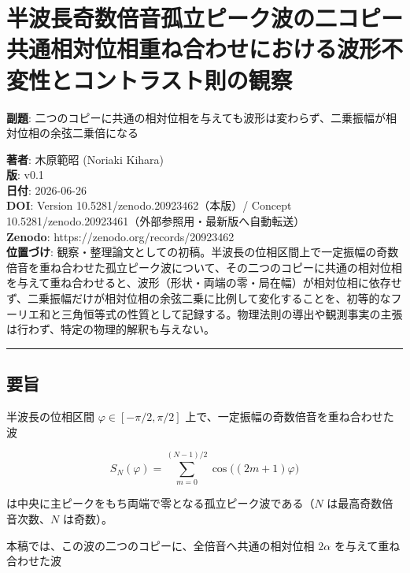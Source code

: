 \documentclass[
]{ltjsarticle}
\author{}
\date{}
\begin{document}
\section{半波長奇数倍音孤立ピーク波の二コピー共通相対位相重ね合わせにおける波形不変性とコントラスト則の観察}\label{ux534aux6ce2ux9577ux5947ux6570ux500dux97f3ux5b64ux7acbux30d4ux30fcux30afux6ce2ux306eux4e8cux30b3ux30d4ux30fcux5171ux901aux76f8ux5bfeux4f4dux76f8ux91cdux306dux5408ux308fux305bux306bux304aux3051ux308bux6ce2ux5f62ux4e0dux5909ux6027ux3068ux30b3ux30f3ux30c8ux30e9ux30b9ux30c8ux5247ux306eux89b3ux5bdf}

\textbf{副題}:
二つのコピーに共通の相対位相を与えても波形は変わらず、二乗振幅が相対位相の余弦二乗倍になる

\textbf{著者}: 木原範昭 (Noriaki Kihara)\\
\textbf{版}: v0.1\\
\textbf{日付}: 2026-06-26\\
\textbf{DOI}: Version 10.5281/zenodo.20923462（本版）/ Concept
10.5281/zenodo.20923461（外部参照用・最新版へ自動転送）\\
\textbf{Zenodo}: https://zenodo.org/records/20923462\\
\textbf{位置づけ}:
観察・整理論文としての初稿。半波長の位相区間上で一定振幅の奇数倍音を重ね合わせた孤立ピーク波について、その二つのコピーに共通の相対位相を与えて重ね合わせると、波形（形状・両端の零・局在幅）が相対位相に依存せず、二乗振幅だけが相対位相の余弦二乗に比例して変化することを、初等的なフーリエ和と三角恒等式の性質として記録する。物理法則の導出や観測事実の主張は行わず、特定の物理的解釈も与えない。

\begin{center}\rule{0.5\linewidth}{0.5pt}\end{center}

\subsection{要旨}\label{ux8981ux65e8}

半波長の位相区間 \(\varphi\in[-\pi/2,\pi/2]\)
上で、一定振幅の奇数倍音を重ね合わせた波

\[
S_N(\varphi)=\sum_{m=0}^{(N-1)/2}\cos\!\big((2m+1)\varphi\big)
\]

は中央に主ピークをもち両端で零となる孤立ピーク波である（\(N\)
は最高奇数倍音次数、\(N\) は奇数）。

本稿では、この波の二つのコピーに、全倍音へ共通の相対位相 \(2\alpha\)
を与えて重ね合わせた波
\end{document}
